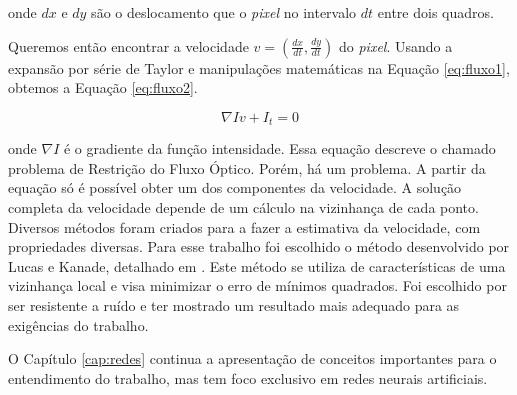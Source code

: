 onde $dx$ e $dy$ são o deslocamento que o \textit{pixel} no intervalo $dt$ entre dois quadros.

Queremos então encontrar a velocidade $v =(\frac{dx}{dt},\frac{dy}{dt})$ do \textit{pixel}. Usando a expansão por série de Taylor e manipulações matemáticas na Equação \ref{eq:fluxo1}, obtemos a Equação \ref{eq:fluxo2}\cite{faria1992fluxo}.

\begin{equation}
	\nabla Iv + I_t = 0
\label{eq:fluxo2}
\end{equation}

onde $\nabla I$ é o gradiente da função intensidade. Essa equação descreve o chamado problema de Restrição do Fluxo Óptico\cite{mota2011tensor}. Porém, há um problema. A partir da equação só é possível obter um dos componentes da velocidade. A solução completa da velocidade depende de um cálculo na vizinhança de cada ponto. Diversos métodos foram criados para a fazer a estimativa da velocidade, com propriedades diversas. Para esse trabalho foi escolhido o método desenvolvido por Lucas e Kanade, detalhado em \cite{bruhn2005lucas,faria1992fluxo,mota2011tensor}. Este método se utiliza de características de uma vizinhança local e visa minimizar o erro de mínimos quadrados. Foi escolhido por ser resistente a ruído e ter mostrado um resultado mais adequado para as exigências do trabalho.



O Capítulo \ref{cap:redes} continua a apresentação de conceitos importantes para o entendimento do trabalho, mas tem foco exclusivo em redes neurais artificiais. 






